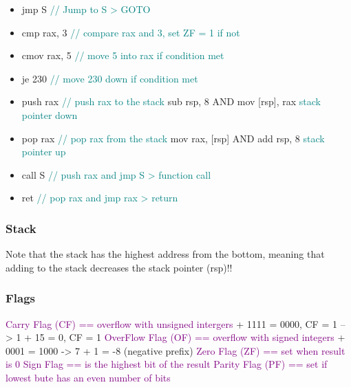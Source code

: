 \documentclass[main.tex,fontsize=8pt,paper=a4,paper=landscape,DIV=calc,]{scrartcl}
\begin{document}
\begin{multicols*}{4}
\begin{itemize}
\item jmp S       \textcolor{teal}{// Jump to S > GOTO}
\item cmp rax, 3 \textcolor{teal}{// compare rax and 3, set ZF = 1 if not}
\item cmov rax, 5 \textcolor{teal}{// move 5 into rax if condition met}
\item je 230 \textcolor{teal}{// move 230 down if condition met}
\item push rax \textcolor{teal}{// push rax to the stack}\newline
  sub rsp, 8 AND mov [rsp], rax \textcolor{teal}{stack pointer down}
\item pop rax \textcolor{teal}{// pop rax from the stack}\newline
  mov rax, [rsp] AND add rsp, 8 \textcolor{teal}{stack pointer up}
\item call S \textcolor{teal}{// push rax and jmp S > function call}
\item ret    \textcolor{teal}{// pop rax and jmp rax > return}
\end{itemize}

\subsubsection{Stack}
Note that the stack has the highest address from the bottom, meaning that adding to the stack decreases the stack pointer (rsp)!!

\subsubsection{Flags}
\textcolor{purple}{Carry Flag (CF) == overflow with unsigned intergers} + 1111 = 0000, CF = 1 --> 1 + 15 = 0, CF = 1
\textcolor{purple}{OverFlow Flag (OF) == overflow with signed integers} + 0001 = 1000 -> 7 + 1 = -8 (negative prefix)
\textcolor{purple}{Zero Flag (ZF) == set when result is 0}
\textcolor{purple}{Sign Flag == is the highest bit of the result}
\textcolor{purple}{Parity Flag (PF) == set if lowest bute has an even number of bits}


\end{multicols*}
\end{document}
